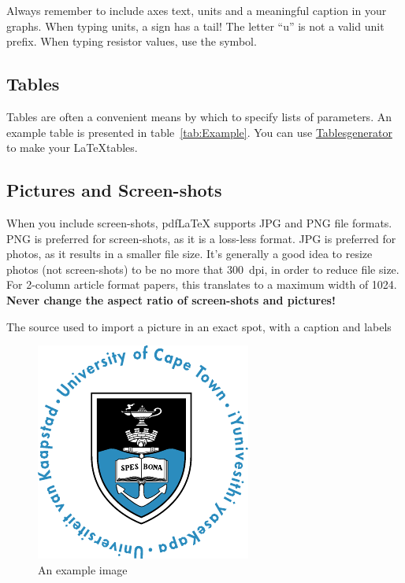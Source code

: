 Always remember to include axes text, units and a meaningful caption in your graphs.  When typing units, a \micro{} sign has a tail!  The letter ``u'' is not a valid unit prefix.  When typing resistor values, use the \Ohm{} symbol.

\subsection{Tables}
Tables are often a convenient means by which to specify lists of parameters.  An example table is presented in table~\ref{tab:Example}. You can use \href{https://www.tablesgenerator.com/}{Tablesgenerator} to make your \LaTeX tables.


\subsection{Pictures and Screen-shots}
When you include screen-shots, pdf\LaTeX{} supports JPG and PNG file formats.  PNG is preferred for screen-shots, as it is a loss-less format.  JPG is preferred for photos, as it results in a smaller file size.  It's generally a good idea to resize photos (not screen-shots) to be no more that 300~dpi, in order to reduce file size.  For 2-column article format papers, this translates to a maximum width of 1024.  \textbf{Never change the aspect ratio of screen-shots and pictures!}

The source used to import a picture in an exact spot, with a caption and labels

\begin{figure}[H]
\centering
\includegraphics[width=0.6\columnwidth]{Figures/UCT}
\caption{An example image}
\label{fig:imageExample}
\end{figure}

